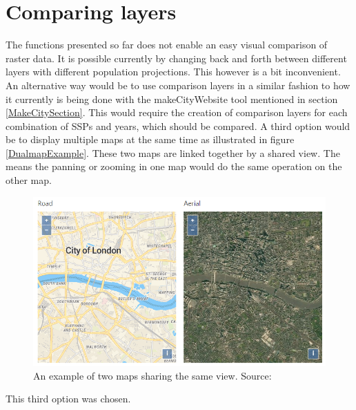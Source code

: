\section{Comparing layers}

The functions presented so far does not enable an easy visual comparison of raster data. It is possible currently by changing back and forth between different layers with different population projections. This however is a bit inconvenient. 
An alternative way would be to use comparison layers in a similar fashion to how it currently is being done with the makeCityWebsite tool mentioned in section \ref{MakeCitySection}. This would require the creation of comparison layers for each combination of SSPs and years, which should be compared.   
A third option would be to display multiple maps at the same time as illustrated in figure \ref{DualmapExample}. These two maps are linked together by a shared view. The means the panning or zooming in one map would do the same operation on the other map.

\begin{figure} [H]
	\centering
	\includegraphics[width=.8\textwidth]{Pictures/DualMapExample}
	\caption{An example of two maps sharing the same view. Source: \citet{DualmapExample}}
	\label{DualMapExample}
\end{figure}


This third option was chosen.
